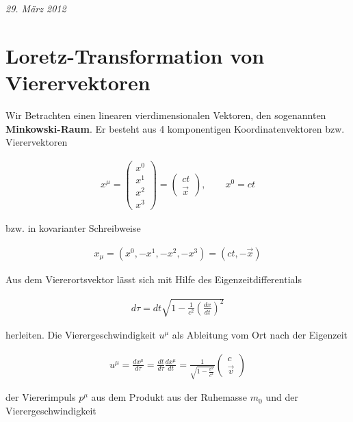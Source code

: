 
\usepackage{amsmath} 





\textit{29. März 2012}


\section*{Loretz-Transformation von Vierervektoren}


Wir Betrachten einen linearen vierdimensionalen Vektoren, den sogenannten  \textbf{Minkowski-Raum}. Er besteht aus 4 komponentigen Koordinatenvektoren bzw. Vierervektoren

\begin{align}
  \label{eq:1}
  x^\mu = \begin{pmatrix}x^0\\x^1\\ x^2\\x^3 \end{pmatrix} = \begin{pmatrix}ct \\\vec x \end{pmatrix}, \qquad x^0=ct
\end{align}

bzw. in kovarianter Schreibweise

\begin{align}
  \label{eq:2}
  x_\mu = (x^0,-x^1,-x^2,-x^3) = (ct,-\vec x)
\end{align}

Aus dem Viererortsvektor lässt sich mit Hilfe des Eigenzeitdifferentials

\begin{align}
  \label{eq:7}
  d\tau = dt\sqrt{1-\frac{1}{c^2}\left(\frac{dx}{dt}\right)^2}
\end{align}

herleiten. Die Vierergeschwindigkeit \(u^\mu\) als Ableitung vom Ort nach der Eigenzeit

\begin{align}
  \label{eq:8}
  u^\mu = \frac{dx^\mu}{d\tau} = \frac{dt}{d\tau}\frac{dx^\mu}{dt}=\frac{1}{\sqrt{1-\frac{v^2}{c^2}}}\begin{pmatrix}c\\\vec v \end{pmatrix}
\end{align}

der Viererimpuls \(p^\mu\) aus dem Produkt aus der Ruhemasse \(m_0\) und der Vierergeschwindigkeit


